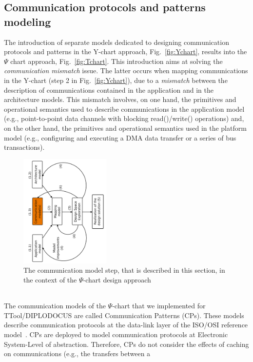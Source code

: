 \documentclass{llncs}
\begin{document}
\subsection{Communication protocols and patterns modeling}
\label{subsec:CP}
%
The introduction of separate models dedicated to designing communication protocols and patterns in the
Y-chart approach, Fig.~\ref{fig:Ychart}, results into the $\Psi$ chart approach, Fig.~\ref{fig:Tchart}. This
introduction aims at solving the \textit{communication mismatch} issue. The latter occurs when mapping communications in
the Y-chart (step 2 in Fig.~\ref{fig:Ychart}), due to a \textit{mismatch} between the description of communications
contained in the application and in the architecture models. This mismatch involves, on one hand, the primitives and
operational semantics used to describe communications in the application model (e.g., point-to-point data channels with
blocking read()/write() operations) and, on the other hand, the primitives and operational semantics used in the
platform model (e.g., configuring and executing a DMA data transfer or a series of bus transactions).
%
\begin{figure}[htbp]
	\centering
	\includegraphics[angle=-90,origin=c,width=0.4\textwidth]{figures/PsiChartCom.pdf}
	\caption{The communication model step, that is described in this section, in the context of the $\Psi$-chart design
    approach}
	\label{fig:PsiChartCom}
\end{figure}
%
\\The communication models of the $\Psi$-chart that we implemented for TTool/\-DI\-PLO\-DO\-CUS are called
Communication Patterns (CPs). These models describe communication protocols at the data-link layer of the ISO/OSI
reference model~\cite{Zimmermann80}. CPs are deployed to model communication protocols at Electronic System-Level of
abstraction. Therefore, CPs do not consider the effects of caching on communications (e.g., the transfers between a
\end{document}
